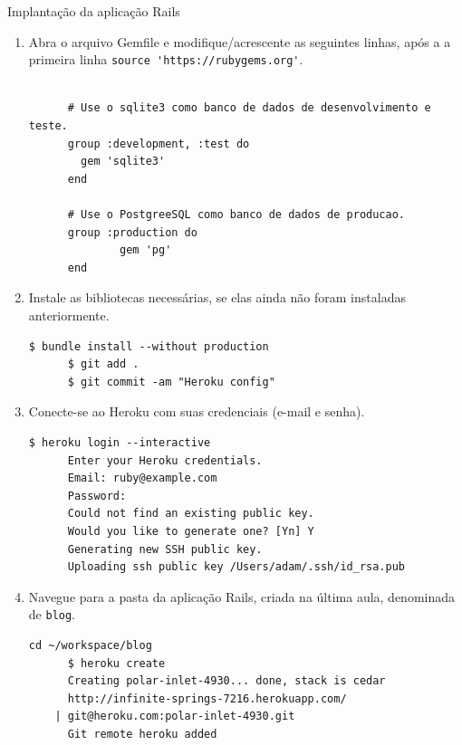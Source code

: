 \begin{frame}{Implantação da aplicação Rails}
\begin{enumerate}
 \framebreak
    \item  Abra o arquivo \alert{Gemfile} e modifique/acrescente as seguintes linhas, após a 
    a primeira linha \verb!source 'https://rubygems.org'!.
    \begin{lstlisting}[style=BashInputStyle]
      
      # Use o sqlite3 como banco de dados de desenvolvimento e teste.
      group :development, :test do
        gem 'sqlite3'
      end 

      # Use o PostgreeSQL como banco de dados de producao.
      group :production do
			  gem 'pg'
      end 
    \end{lstlisting}     
 \framebreak
 \framebreak
    \item  Instale as bibliotecas necessárias, se elas ainda não foram instaladas
      anteriormente.
    \begin{lstlisting}[style=BashInputStyle]
      $ bundle install --without production
      $ git add .
      $ git commit -am "Heroku config"
    \end{lstlisting}
 
 \framebreak
     
    \item  Conecte-se ao Heroku com suas credenciais (e-mail e senha).
    \begin{lstlisting}[style=BashInputStyle]
      $ heroku login --interactive
      Enter your Heroku credentials.
      Email: ruby@example.com
      Password:
      Could not find an existing public key.
      Would you like to generate one? [Yn] Y
      Generating new SSH public key.
      Uploading ssh public key /Users/adam/.ssh/id_rsa.pub
    \end{lstlisting}

    \item Navegue para a pasta da aplicação Rails, criada na última aula, denominada de \verb!blog!.
    \begin{lstlisting}[style=BashInputStyle]
      cd ~/workspace/blog
      $ heroku create
      Creating polar-inlet-4930... done, stack is cedar
      http://infinite-springs-7216.herokuapp.com/ 
	| git@heroku.com:polar-inlet-4930.git
      Git remote heroku added
    \end{lstlisting}
    

\end{enumerate}
\end{frame}
